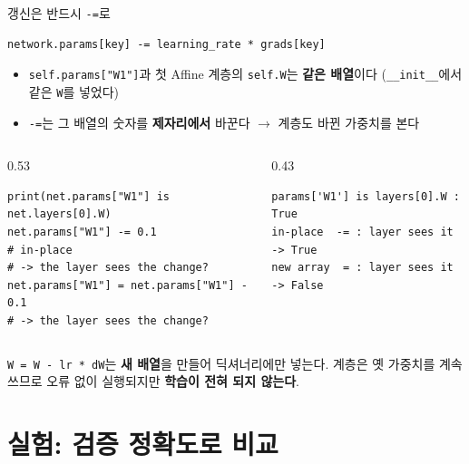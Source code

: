 \documentclass[aspectratio=169,11pt]{beamer}
\newcommand{\code}[1]{\texttt{#1}}
\begin{document}
\begin{frame}[fragile]{갱신은 반드시 \code{-=}로}
\begin{lstlisting}
network.params[key] -= learning_rate * grads[key]
\end{lstlisting}
\begin{itemize}
\item \code{self.params["W1"]}과 첫 Affine 계층의 \code{self.W}는 \textbf{같은 배열}이다 (\code{\_\_init\_\_}에서 같은 \code{W}를 넣었다)
\item \code{-=}는 그 배열의 숫자를 \textbf{제자리에서} 바꾼다 $\to$ 계층도 바뀐 가중치를 본다
\end{itemize}
\begin{columns}[T,onlytextwidth]
\begin{column}{0.53\textwidth}
\begin{lstlisting}
print(net.params["W1"] is net.layers[0].W)
net.params["W1"] -= 0.1              # in-place
# -> the layer sees the change?
net.params["W1"] = net.params["W1"] - 0.1
# -> the layer sees the change?
\end{lstlisting}
\end{column}
\begin{column}{0.43\textwidth}
\begin{lstlisting}[style=outstyle]
params['W1'] is layers[0].W : True
in-place  -= : layer sees it -> True
new array  = : layer sees it -> False
\end{lstlisting}
\end{column}
\end{columns}
\vskip1mm
\begin{thinkbox}[\code{=}로 쓰면?]
\small
\code{W = W - lr * dW}는 \textbf{새 배열}을 만들어 딕셔너리에만 넣는다. 계층은 옛 가중치를 계속 쓰므로
오류 없이 실행되지만 \textbf{학습이 전혀 되지 않는다}.
\end{thinkbox}
\end{frame}

\section{실험: 검증 정확도로 비교}
\end{document}
